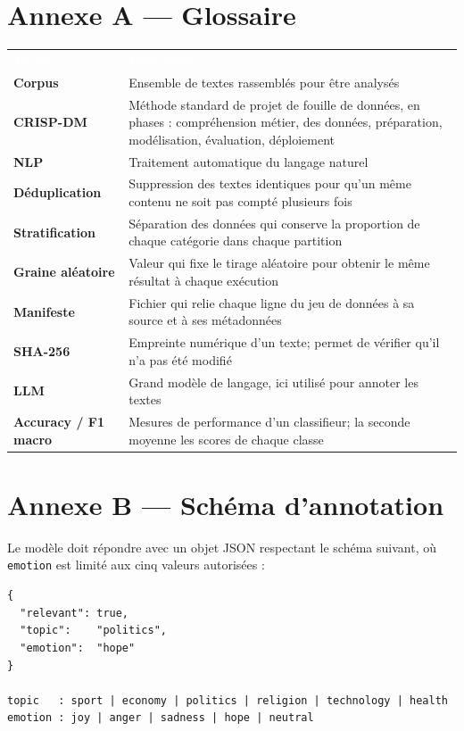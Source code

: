 \documentclass[11pt,a4paper]{article}
\newcommand{\headtab}[1]{\textcolor{white}{\sffamily\bfseries #1}}
\begin{document}
\section*{Annexe A --- Glossaire}
\begin{table}[H]
\centering
{}
\begin{tabularx}{\linewidth}{>{\sffamily\bfseries\small}p{3.5cm} X}
\rowcolor{navy}\headtab{Terme} & \headtab{Définition} \\
Corpus & Ensemble de textes rassemblés pour être analysés \\
CRISP-DM & Méthode standard de projet de fouille de données, en phases : compréhension métier, des données, préparation, modélisation, évaluation, déploiement \\
NLP & Traitement automatique du langage naturel \\
Déduplication & Suppression des textes identiques pour qu'un même contenu ne soit pas compté plusieurs fois \\
Stratification & Séparation des données qui conserve la proportion de chaque catégorie dans chaque partition \\
Graine aléatoire & Valeur qui fixe le tirage aléatoire pour obtenir le même résultat à chaque exécution \\
Manifeste & Fichier qui relie chaque ligne du jeu de données à sa source et à ses métadonnées \\
SHA-256 & Empreinte numérique d'un texte; permet de vérifier qu'il n'a pas été modifié \\
LLM & Grand modèle de langage, ici utilisé pour annoter les textes \\
Accuracy / F1 macro & Mesures de performance d'un classifieur; la seconde moyenne les scores de chaque classe \\
\bottomrule
\end{tabularx}
\end{table}

\section*{Annexe B --- Schéma d'annotation}
Le modèle doit répondre avec un objet JSON respectant le schéma suivant, où \texttt{emotion} est limité aux cinq valeurs autorisées :

\begin{tcolorbox}[enhanced,colback=mist,colframe=mist,borderline west={3pt}{0pt}{navy},
  arc=2pt,left=10pt,top=5pt,bottom=5pt]
\begin{lstlisting}[style=cmd]
{
  "relevant": true,
  "topic":    "politics",
  "emotion":  "hope"
}

topic   : sport | economy | politics | religion | technology | health
emotion : joy | anger | sadness | hope | neutral
\end{lstlisting}
\end{tcolorbox}
\end{document}
